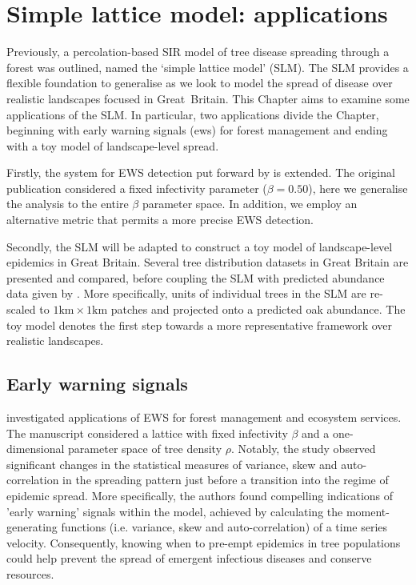 
\chapter{Simple lattice model: applications}
\label{chapter:SLM-applications}

Previously, a percolation-based SIR model of tree disease spreading through a forest was outlined, named the `simple lattice model' (SLM). The SLM provides a flexible foundation to generalise as we look to model the spread of disease over realistic landscapes focused in Great Britain. This Chapter aims to examine some applications of the SLM. In particular, two applications divide the Chapter, beginning with early warning signals (\acrshort{ews}) for forest management and ending with a toy model of landscape-level spread.

Firstly, the system for EWS detection put forward by \cite{OROZCOFUENTES201912} is extended. 
The original publication considered a fixed infectivity parameter ($\beta = 0.50$), here we generalise the analysis to the entire $\beta$ parameter space. 
In addition, we employ an alternative metric that permits a more precise EWS detection.

Secondly, the SLM will be adapted to construct a toy model of landscape-level epidemics in Great Britain.
Several tree distribution datasets in Great Britain are presented and compared, before coupling the SLM with predicted abundance data given by \cite{hill.data}. More specifically, units of individual trees in the SLM are re-scaled to $\mathrm{1km \times 1km}$ patches and projected onto a predicted oak abundance. The toy model denotes the first step towards a more representative framework over realistic landscapes.

\section{Early warning signals}
\label{sec:EWS}

\cite{OROZCOFUENTES201912} investigated applications of EWS  for forest management and ecosystem services. The manuscript considered a lattice with fixed infectivity $\beta$ and a one-dimensional parameter space of tree density $\rho$. Notably, the study observed significant changes in the statistical measures of variance, skew and auto-correlation in the spreading pattern just before a transition into the regime of epidemic spread. More specifically, the authors found compelling indications of 'early warning' signals within the model, achieved by calculating the moment-generating functions (i.e. variance, skew and auto-correlation) of a time series velocity. Consequently, knowing when to pre-empt epidemics in tree populations could help prevent the spread of emergent infectious diseases and conserve resources. 


